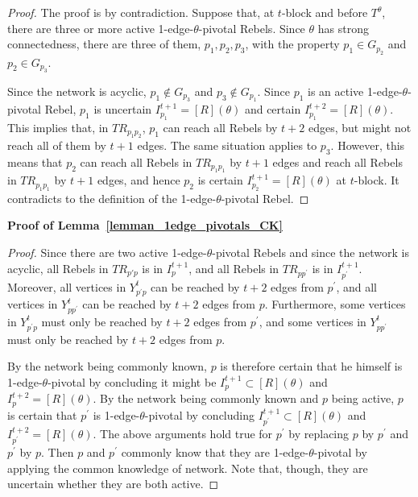 \documentclass[12pt,letter]{article}
\newtheorem*{lemma*}{Lemma}
\theoremstyle{definition}
\theoremstyle{definition}
\theoremstyle{remark}
\theoremstyle{claim}
\begin{document}
\begin{proof}
The proof is by contradiction. Suppose that, at $t$-block and before $T^{\theta}$, there are three or more active 1-edge-$\theta$-pivotal Rebels. Since $\theta$ has strong connectedness, there are three of them, $p_1,p_2,p_3$, with the property $p_1\in G_{p_2}$ and $p_2 \in G_{p_3}$. 

Since the network is acyclic, $p_1\notin G_{p_3}$ and $p_3\notin G_{p_1}$. Since $p_1$ is an active 1-edge-$\theta$-pivotal Rebel, $p_1$ is uncertain  $I^{t+1}_{p_1}= [R](\theta)$ and certain $I^{t+2}_{p_1}=[R](\theta)$. This implies that, in $TR_{p_1p_2}$, $p_1$ can reach all Rebels by $t+2$ edges, but might not reach all of them by $t+1$ edges. The same situation applies to $p_3$. However, this means that $p_2$ can reach all Rebels in $TR_{p_1p_1}$ by $t+1$ edges and reach all Rebels in $TR_{p_1p_1}$ by $t+1$ edges, and hence $p_2$ is certain $I^{t+1}_{p_2}=[R](\theta)$ at $t$-block. It contradicts to the definition of the 1-edge-$\theta$-pivotal Rebel.

\end{proof}
\bigskip

\bigskip
\noindent\textbf{Proof of Lemma~\ref{lemman_1edge_pivotals_CK}}
\begin{proof}
Since there are two active 1-edge-$\theta$-pivotal Rebels and since the network is acyclic, all Rebels in $TR_{p{'}p}$ is in $I^{t+1}_{p}$, and all Rebels in $TR_{pp^{'}}$ is in $I^{t+1}_{p^{'}}$. Moreover, all vertices in $Y^t_{p^{'}p}$ can be reached by $t+2$ edges from $p^{'}$, and all vertices in $Y^t_{pp^{'}}$ can be reached by $t+2$ edges from $p$. Furthermore, some vertices in $Y^t_{p^{'}p}$ must only be reached by $t+2$ edges from $p^{'}$, and some vertices in $Y^t_{pp^{'}}$ must only be reached by $t+2$ edges from $p$. 

By the network being commonly known, $p$ is therefore certain that he himself is 1-edge-$\theta$-pivotal by concluding it might be $I^{t+1}_{p}\subset [R](\theta)$ and $I^{t+2}_{p}=[R](\theta)$. By the network being commonly known and $p$ being active, $p$ is certain that $p^{'}$ is 1-edge-$\theta$-pivotal by concluding $I^{t+1}_{p^{'}}\subset [R](\theta)$ and $I^{t+2}_{p^{'}}=[R](\theta)$. The above arguments hold true for $p^{'}$ by replacing $p$ by $p^{'}$ and $p^{'}$ by $p$. Then $p$ and $p^{'}$ commonly know that they are 1-edge-$\theta$-pivotal by applying the common knowledge of network. Note that, though, they are uncertain whether they are both active.
\end{proof}
\bigskip
\end{document}
